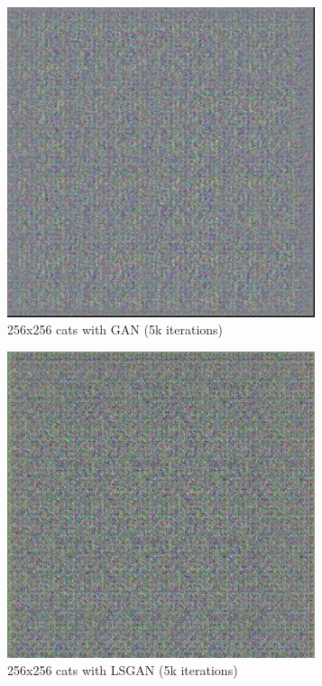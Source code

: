 \documentclass{article}
\begin{document}
\begin{figure}[H]
	\centering
	\includegraphics[width=256pt]{GAN.jpeg}
	\caption{256x256 cats with GAN (5k iterations)}
\end{figure}

\begin{figure}[H]
	\centering
	\includegraphics[width=256pt]{LSGAN.jpeg}
	\caption{256x256 cats with LSGAN (5k iterations)}
\end{figure}
\end{document}
